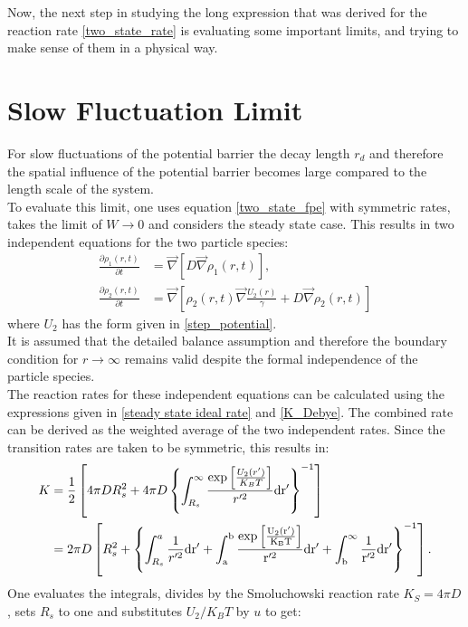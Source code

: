 
Now, the next step in studying the long expression that was derived for the reaction rate \eqref{two_state_rate} is evaluating some important limits, and trying to make sense of them in a physical way.
\section{Slow Fluctuation Limit}
\label{lim_long_rd}
For slow fluctuations of the potential barrier the decay length $r_d$ and therefore the spatial influence of the potential barrier becomes large compared to the length scale of the system. \\ 
To evaluate this limit, one uses equation \eqref{two_state_fpe} with symmetric rates, takes the limit of $W \rightarrow 0$ and considers the steady state case.
This results in two independent equations for the two particle species:
\begin{align}
    \frac{\partial \rho_1(r,t)}{\partial t} &= \vec \nabla \left[ D \vec \nabla \rho_1(r,t) \right], \\ \nonumber
    \frac{\partial \rho_2(r,t)}{\partial t} &= \vec \nabla \left[\rho_2(r,t) \vec \nabla \frac{U_2(r)}{\gamma} + D \vec \nabla \rho_2(r,t) \right]
    \label{two_state_fpe_W_to_0}
\end{align}
where $U_2$ has the form given in \eqref{step_potential}. \\
It is assumed that the detailed balance assumption and therefore the boundary condition for $r \rightarrow \infty$ remains valid despite the formal independence of the particle species.\\
The reaction rates for these independent equations can be calculated using the expressions given in \eqref{steady state ideal rate} and \eqref{K_Debye}. The combined rate can be derived as the weighted average of the two independent rates. Since the transition rates are taken to be symmetric, this results in:
\begin{align}
    K &= \frac{1}{2} \left[ 4 \pi D R_s^2 + 4 \pi D  \left\{\int_{R_s}^{\infty} \frac{\exp \left[ \frac{U_2(r')}{K_B T}\right]}{r'^2} \rm d r' \right\}^{-1} \right] \\ \nonumber
    &= 2 \pi D \left[ R_s^2 +\left\{\int_{R_s}^{a} \frac{1}{r'^2} \rm d r' + \int_{a}^{b} \frac{\exp \left[ \frac{U_2(r')}{K_B T}\right]}{r'^2} \rm d r' + \int_{b}^{\infty} \frac{1}{r'^2} \rm d r' \right\}^{-1} \right].
\end{align}
One evaluates the integrals, divides by the Smoluchowski reaction rate $K_S = 4 \pi D$, sets $R_s$ to one and substitutes $U_2/K_B T$ by $u$ to get:
